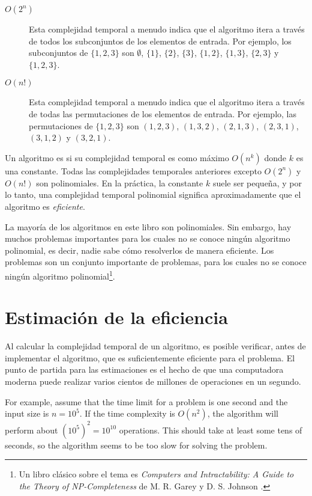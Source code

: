 \begin{description}
\item[$O(2^n)$]
Esta complejidad temporal a menudo indica que
el algoritmo itera a través de todos
los subconjuntos de los elementos de entrada.
Por ejemplo, los subconjuntos de $\{1,2,3\}$ son
$\emptyset$, $\{1\}$, $\{2\}$, $\{3\}$, $\{1,2\}$,
$\{1,3\}$, $\{2,3\}$ y $\{1,2,3\}$.

\item[$O(n!)$]
Esta complejidad temporal a menudo indica que
el algoritmo itera a través de todas
las permutaciones de los elementos de entrada.
Por ejemplo, las permutaciones de $\{1,2,3\}$ son
$(1,2,3)$, $(1,3,2)$, $(2,1,3)$, $(2,3,1)$,
$(3,1,2)$ y $(3,2,1)$.

\end{description}

Un algoritmo es 
si su complejidad temporal es como máximo $O(n^k)$
donde $k$ es una constante.
Todas las complejidades temporales anteriores excepto
$O(2^n)$ y $O(n!)$ son polinomiales.
En la práctica, la constante $k$ suele ser pequeña,
y por lo tanto, una complejidad temporal polinomial
significa aproximadamente que el algoritmo es \emph{eficiente}.


La mayoría de los algoritmos en este libro son polinomiales.
Sin embargo, hay muchos problemas importantes para los cuales
no se conoce ningún algoritmo polinomial, es decir,
nadie sabe cómo resolverlos de manera eficiente.
Los problemas  son un conjunto importante
de problemas, para los cuales no se conoce ningún algoritmo
polinomial\footnote{Un libro clásico sobre el tema es
\emph{Computers and Intractability: A Guide to the Theory
of NP-Completeness} de M. R. Garey y D. S. Johnson \cite{gar79}.}.

\section{Estimación de la eficiencia}

Al calcular la complejidad temporal de un algoritmo,
es posible verificar, antes de
implementar el algoritmo, que es
suficientemente eficiente para el problema.
El punto de partida para las estimaciones es el hecho de que
una computadora moderna puede realizar varios cientos de
millones de operaciones en un segundo.

For example, assume that the time limit for
a problem is one second and the input size is $n=10^5$.
If the time complexity is $O(n^2)$,
the algorithm will perform about $(10^5)^2=10^{10}$ operations.
This should take at least some tens of seconds,
so the algorithm seems to be too slow for solving the problem.

